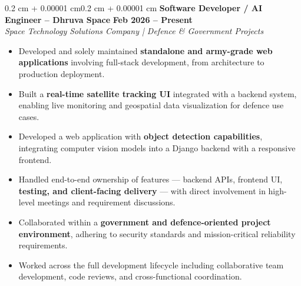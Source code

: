 \documentclass[10pt, letterpaper]{article}
\newenvironment{highlights}{\begin{itemize}[topsep=0.10 cm,parsep=0.10 cm,partopsep=0pt,itemsep=0pt,leftmargin=0.4 cm + 10pt]}{\end{itemize}}
\newenvironment{onecolentry}{\begin{adjustwidth}{0.2 cm + 0.00001 cm}{0.2 cm + 0.00001 cm}}{\end{adjustwidth}}
\begin{document}
\begin{onecolentry}
\textbf{Software Developer / AI Engineer -- Dhruva Space} 
\hfill \textbf{Feb 2026 -- Present} \\
\textit{Space Technology Solutions Company | Defence \& Government Projects}

\begin{highlights}
    \item Developed and solely maintained \textbf{standalone and army-grade web applications} involving full-stack development, from architecture to production deployment.
    \item Built a \textbf{real-time satellite tracking UI} integrated with a backend system, enabling live monitoring and geospatial data visualization for defence use cases.
    \item Developed a web application with \textbf{object detection capabilities}, integrating computer vision models into a Django backend with a responsive frontend.
    \item Handled end-to-end ownership of features — backend APIs, frontend UI, \textbf{testing, and client-facing delivery} — with direct involvement in high-level meetings and requirement discussions.
    \item Collaborated within a \textbf{government and defence-oriented project environment}, adhering to security standards and mission-critical reliability requirements.
    \item Worked across the full development lifecycle including collaborative team development, code reviews, and cross-functional coordination.
\end{highlights}

\end{onecolentry}
\end{document}
